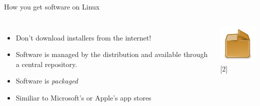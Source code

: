     \begin{frame}[t,fragile]{How you get software on Linux}
        \begin{columns}[T]
            \begin{itemize}
                \item Don't download installers from the internet!
                \item Software is managed by the distribution and available
                    through a central repository.
                \item Software is \emph{packaged}
                \item Similiar to Microsoft's or Apple's app stores
            \end{itemize}
            \vspace{-1cm}
            \begin{center}
                \includegraphics[width=0.7\columnwidth]{img/package-icon.pdf}
                {\tiny [2]}
            \end{center}
        \end{columns}
    \end{frame}

